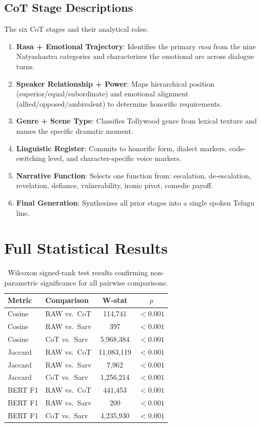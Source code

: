 \documentclass[11pt]{article}
\begin{document}
\subsection{CoT Stage Descriptions}
\label{subsec:appendix-cot}

The six CoT stages and their analytical roles:

\begin{enumerate}[leftmargin=*,itemsep=1pt]
    \item \textbf{Rasa + Emotional Trajectory}: Identifies the primary \textit{rasa} from the nine Natyashastra categories and characterizes the emotional arc across dialogue turns.
    \item \textbf{Speaker Relationship + Power}: Maps hierarchical position (superior/equal/subordinate) and emotional alignment (allied/opposed/ambivalent) to determine honorific requirements.
    \item \textbf{Genre + Scene Type}: Classifies Tollywood genre from lexical texture and names the specific dramatic moment.
    \item \textbf{Linguistic Register}: Commits to honorific form, dialect markers, code-switching level, and character-specific voice markers.
    \item \textbf{Narrative Function}: Selects one function from: escalation, de-escalation, revelation, defiance, vulnerability, ironic pivot, comedic payoff.
    \item \textbf{Final Generation}: Synthesizes all prior stages into a single spoken Telugu line.
\end{enumerate}

\section{Full Statistical Results}
\label{sec:appendix-stats}

\begin{table}[h]
\centering
\small
\begin{tabular}{@{}llcc@{}}
\toprule
\textbf{Metric} & \textbf{Comparison} & \textbf{W-stat} & \textbf{$p$} \\
\midrule
Cosine & RAW vs.\ CoT & 114,741 & $< 0.001$ \\
Cosine & RAW vs.\ Sarv & 397 & $< 0.001$ \\
Cosine & CoT vs.\ Sarv & 5,968,384 & $< 0.001$ \\
Jaccard & RAW vs.\ CoT & 11,083,119 & $< 0.001$ \\
Jaccard & RAW vs.\ Sarv & 7,962 & $< 0.001$ \\
Jaccard & CoT vs.\ Sarv & 1,256,214 & $< 0.001$ \\
BERT F1 & RAW vs.\ CoT & 441,453 & $< 0.001$ \\
BERT F1 & RAW vs.\ Sarv & 200 & $< 0.001$ \\
BERT F1 & CoT vs.\ Sarv & 4,235,930 & $< 0.001$ \\
\bottomrule
\end{tabular}
\caption{Wilcoxon signed-rank test results confirming non-parametric significance for all pairwise comparisons.}
\label{tab:wilcoxon}
\end{table}
\end{document}
